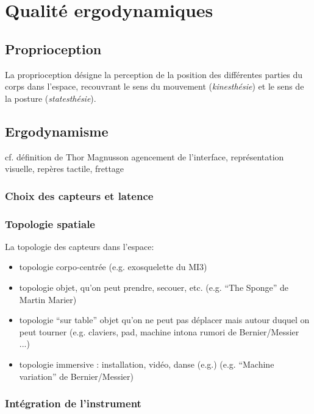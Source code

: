 \section{Qualité ergodynamiques}


\subsection{Proprioception}
La proprioception désigne la perception de la position des différentes parties du corps dans l'espace, recouvrant le sens du mouvement (\textit{kinesthésie}) et le sens de la posture (\textit{statesthésie}).


\subsection{Ergodynamisme}
cf. définition de Thor Magnusson
agencement de l’interface, représentation visuelle, repères tactile, frettage

\subsubsection{Choix des capteurs et latence}




\subsubsection{Topologie spatiale}

La topologie des capteurs dans l'espace:
\vspace{-1em}
\begin{itemize}[noitemsep]
	\item topologie corpo-centrée (e.g. exosquelette du MI3)
	\item topologie objet, qu'on peut prendre, secouer, etc. (e.g. ``The Sponge'' de Martin Marier)
	\item topologie ``sur table'' objet qu'on ne peut pas déplacer mais autour duquel on peut tourner (e.g. claviers, pad, machine intona rumori de Bernier/Messier ...)
	\item topologie immersive : installation, vidéo, danse (e.g.) (e.g. ``Machine variation'' de Bernier/Messier)
\end{itemize}



\subsubsection{Intégration de l'instrument}

